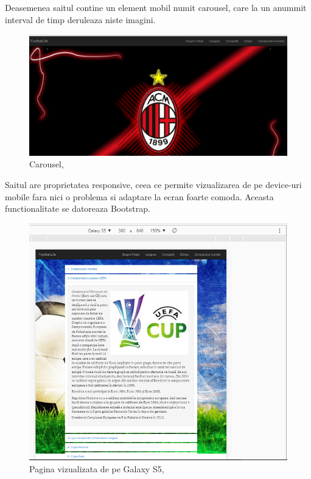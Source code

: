 Deasemenea saitul contine un element mobil numit carousel, care la un anummit 
interval de timp deruleaza niste imagini.
\begin{figure}[!ht]
                     \centering
                     \includegraphics[scale = 0.6]{carousel}
                     \caption{Carousel, \cite{ImRef}}
                     \label{Im_label}
                \end{figure}

Saitul are proprietatea responsive, ceea ce permite vizualizarea de pe device-uri mobile 
fara nici o problema si adaptare la ecran foarte comoda.
Aceasta functionalitate se datoreaza Bootstrap.

\begin{figure}[!ht]
                     \centering
                     \includegraphics[scale = 0.6]{responsive}
                     \caption{Pagina vizualizata de pe Galaxy S5, \cite{ImRef}}
                     \label{Im_label}
                \end{figure}


\clearpage